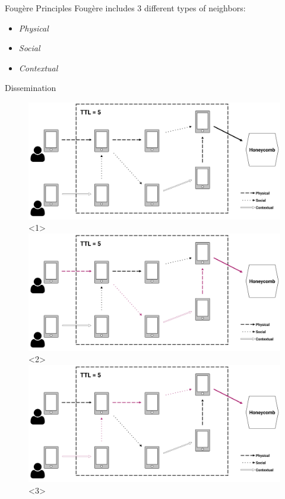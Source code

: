 \begin{frame}{Foug\`ere Principles}
    Foug\`ere includes 3 different types of neighbors:
    \begin{itemize}
        \item \textit{Physical}
        \item \textit{Social}
        \item \textit{Contextual}
    \end{itemize}
\end{frame}

\begin{frame}{Dissemination}
  \begin{figure}[<+->]
    \includegraphics[width=\textwidth]{figures/ttl}<1>
    \includegraphics[width=\textwidth]{figures/ttl1}<2>
    \includegraphics[width=\textwidth]{figures/ttl2}<3>
  \end{figure}
\end{frame}

